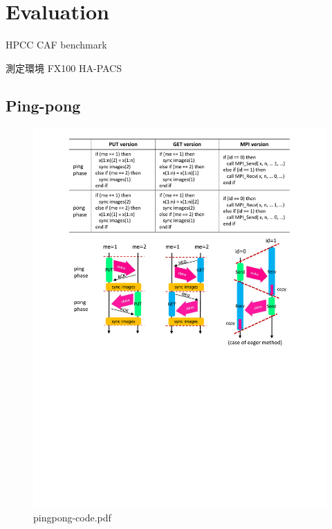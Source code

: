 \section{Evaluation}\label{sec:eval}

HPCC CAF benchmark

測定環境
FX100
HA-PACS


\subsection{Ping-pong}

\begin{figure}[bth]
  \begin{center}
    \mbox{\includegraphics[trim=24mm 118mm 24mm 4mm, scale=0.7,clip]{figs/pingpong-code.pdf}}
    \caption{pingpong-code.pdf}\label{fig:pingpong-code}
  \end{center}
\end{figure}

